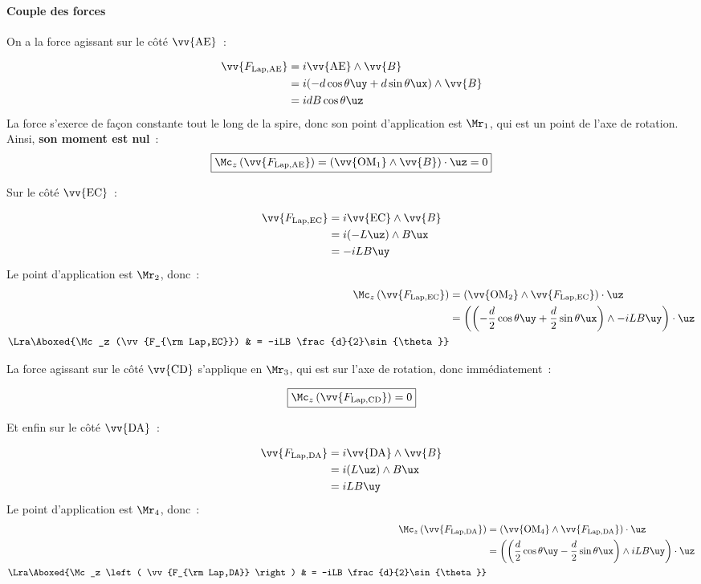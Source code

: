 \documentclass[../main/main.tex]{subfiles}
\begin{document}
\paragraph*{Couple des forces} On a la force agissant sur le côté $\vv{\rm
		AE}$~:
\begin{hide}
	\begin{align*}
		\vv{F_{\rm Lap,AE}}
		 & = i \vv{\rm AE}\wedge \vv{B}
		\\
		 & = i (-d \cos{\theta}\uy + d\sin{\theta}\ux)\wedge \vv{B}
		\\
		 & = idB\cos{\theta}\uz
	\end{align*}
	La force s'exerce de façon constante tout le long de la spire, donc son point
	d'application est $\Mr_1$, qui est un point de l'axe de rotation. Ainsi,
	\textbf{son moment est nul}~:
	\[
		\boxed{\Mc_z \left( \vv{F_{\rm Lap,AE}} \right) =
			\left( \vv{\rm OM_1}\wedge \vv{B} \right)\cdot \uz
			= 0}
	\]
\end{hide}
\noindent
Sur le côté $\vv{\rm EC}$~:
\begin{hide}
	\begin{align*}
		\vv{F_{\rm Lap,EC}}
		 & = i \vv{\rm EC}\wedge \vv{B}
		\\
		 & = i (-L\uz)\wedge B\ux
		\\
		 & = -iLB\uy
	\end{align*}
	Le point d'application est $\Mr_2$, donc~:
	\begin{align*}
		\Mc_z \left(\vv{F_{\rm Lap,EC}}\right)
		 & = \left(\vv{\rm OM_2}\wedge \vv{F_{\rm Lap,EC}}\right)\cdot \uz
		\\
		 & = \left(
		\left(
			-\frac{d}{2}\cos{\theta}\uy +
			\frac{d}{2}\sin{\theta}\ux
			\right)\wedge -iLB\uy
		\right)\cdot \uz
		\\\Lra
		\Aboxed{\Mc_z (\vv{F_{\rm Lap,EC}})
		 & = -iLB \frac{d}{2}\sin{\theta}}
	\end{align*}
\end{hide}
\noindent
La force agissant sur le côté $\vv{\rm CD}$ s'applique en $\Mr_3$, qui est sur
l'axe de rotation, donc immédiatement~:
\begin{hide}
	\[
		\boxed{\Mc_z \left( \vv{F_{\rm Lap,CD}} \right) = 0}
	\]
\end{hide}
\noindent
Et enfin sur le côté $\vv{\rm DA}$~:
\begin{hide}
	\begin{align*}
		\vv{F_{\rm Lap,DA}}
		 & = i \vv{\rm DA}\wedge \vv{B}
		\\
		 & = i (L\uz)\wedge B\ux
		\\
		 & = iLB\uy
	\end{align*}
	Le point d'application est $\Mr_4$, donc~:
	\begin{align*}
		\Mc_z \left( \vv{F_{\rm Lap,DA}} \right)
		 & = \left( \vv{\rm OM_4} \wedge \vv{F_{\rm Lap,DA}} \right)\cdot \uz
		\\
		 & = \left(
		\left(
			\frac{d}{2}\cos{\theta}\uy
			- \frac{d}{2}\sin{\theta}\ux
			\right)\wedge iLB\uy
		\right)\cdot \uz
		\\\Lra
		\Aboxed{\Mc_z \left( \vv{F_{\rm Lap,DA}} \right)
		 & = -iLB \frac{d}{2}\sin{\theta}}
	\end{align*}
\end{hide}
\end{document}
